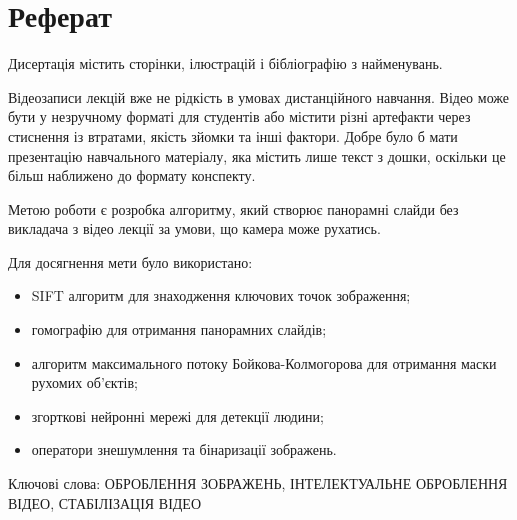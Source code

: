 \chapter*{Реферат}

Дисертація містить
\pageref{LastPage}
сторінки,
ілюстрацій
і бібліографію з
найменувань.

Відеозаписи лекцій вже не рідкість в умовах дистанційного навчання.
Відео може бути у незручному форматі для студентів або містити різні артефакти
через стиснення із втратами, якість зйомки та  інші фактори. Добре було б мати
презентацію навчального матеріалу, яка містить лише текст з дошки,
оскільки це більш наближено до формату конспекту.

Метою роботи є розробка алгоритму,
який створює панорамні слайди без викладача з відео лекції
за умови, що камера може рухатись.

Для досягнення мети було використано:
\begin{itemize}
  \item
        SIFT алгоритм для знаходження ключових точок зображення;
  \item   
        гомографію для отримання панорамних слайдів;
  \item
        алгоритм максимального потоку Бойкова-Колмогорова
        для отримання маски рухомих об'єктів;
  \item
        згорткові нейронні мережі для детекції людини;
  \item
        оператори знешумлення та бінаризації зображень.
\end{itemize}

Ключові слова:
\MakeUppercase{оброблення зображень, інтелектуальне оброблення відео,
  стабілізація відео}
